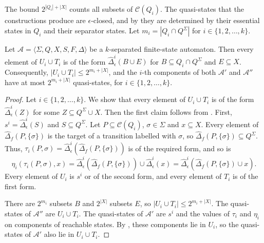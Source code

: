 The bound $2^{|Q_i| + |X|}$ counts all subsets of $\mathcal{C}(Q_i)$. The quasi-states
that the constructions produce are $\epsilon$-closed, and by
 they are determined by their essential states in $Q_i$
and their separator states. Let $m_i = |Q_i \cap Q^\Sigma|$ for $i \in \{ 1, 2, \ldots,
k \}$.

\begin{lemma}\label{lem:quasidet_essential}
  Let $\mathcal{A} = \langle \Sigma, Q, X, S, F, \Delta \rangle$ be a $k$-separated
  finite-state automaton. Then every element of $U_i \cup T_i$ is of the form
  $\hat{\Delta}_\epsilon^i(B \cup E)$ for $B \subseteq Q_i \cap Q^\Sigma$ and $E
  \subseteq X$. Consequently, $|U_i \cup T_i| \leq 2^{m_i + |X|}$, and the $i$-th
  components of both $\mathcal{A}'$ and $\mathcal{A}''$ have at most $2^{m_i + |X|}$
  quasi-states, for $i \in \{ 1, 2, \ldots, k \}$.
\end{lemma}

\begin{proof}
  Let $i \in \{ 1, 2, \ldots, k \}$. We show that every element of $U_i \cup T_i$ is of
  the form $\hat{\Delta}_\epsilon^i(Z)$ for some $Z \subseteq Q^\Sigma \cup X$. Then the
  first claim follows from . First, $s^i =
  \hat{\Delta}_\epsilon^i(S)$ and $S \subseteq Q^\Sigma$. Let $P \subseteq
  \mathcal{C}(Q_i)$, $\sigma \in \Sigma$ and $x \subseteq X$. Every element of
  $\hat{\Delta}_f(P, \{ \sigma \})$ is the target of a transition labelled with
  $\sigma$, so $\hat{\Delta}_f(P, \{ \sigma \}) \subseteq Q^\Sigma$. Thus, $\tau_i(P,
  \sigma) = \hat{\Delta}_\epsilon^i(\hat{\Delta}_f(P, \{ \sigma \}))$ is of the required
  form, and so is
  \begin{equation*}
    \eta_i(\tau_i(P, \sigma), x) = \hat{\Delta}_\epsilon^i(\hat{\Delta}_f(P, \{ \sigma
    \})) \cup \hat{\Delta}_\epsilon^i(x) = \hat{\Delta}_\epsilon^i(\hat{\Delta}_f(P, \{
    \sigma \}) \cup x).
  \end{equation*}
  Every element of $U_i$ is $s^i$ or of the second form, and every element of $T_i$ is
  of the first form.

  There are $2^{m_i}$ subsets $B$ and $2^{|X|}$ subsets $E$, so $|U_i \cup T_i| \leq
  2^{m_i + |X|}$. The quasi-states of $\mathcal{A}''$ are $U_i \cup T_i$. The
  quasi-states of $\mathcal{A}'$ are $s^i$ and the values of $\tau_i$ and $\eta_i$ on
  components of reachable states. By , these components
  lie in $U_i$, so the quasi-states of $\mathcal{A}'$ also lie in $U_i \cup T_i$.
\end{proof}

